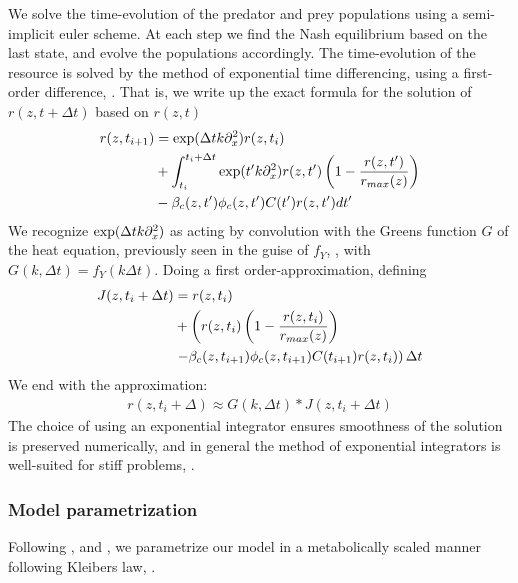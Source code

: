 We solve the time-evolution of the predator and prey populations using a semi-implicit euler scheme. At each step we find the Nash equilibrium based on the last state, and evolve the populations accordingly. The time-evolution of the resource is solved by the method of exponential time differencing, using a first-order difference, \citep{hochbruck2010exponential}. That is, we write up the exact formula for the solution of $r(z,t+\Delta t)$ based on $r(z,t)$
\begin{align}
  r(z,t_{i+1}) &= \exp(\Delta t k \part_x^2) r(z,t_{i}) \\
  & +\int_{t_i}^{t_{i}+\Delta t} \exp(t' k \part_x^2) r(z,t')\pa{1-\frac{r(z,t')}{r_{max}(z)}} \\
  & - \beta_c(z,t')\phi_c(z,t')C(t') r(z,t') dt'
\end{align}
We recognize $\exp(\Delta t k \partial_x^2)$ as acting by convolution with the Greens function $G$ of the heat equation, previously seen in the guise of $f_Y$, , with $G(k,\Delta t)=f_Y(k\Delta t)$.
Doing a first order-approximation, defining
\begin{align}
  J(z,t_{i}+\Delta t) &= r(z,t_i) \\
  &+ \left ( r(z,t_i)\pa{1-\frac{r(z,t_i)}{r_{max}(z)}} \right . \\
  & \left . - \beta_c(z,t_{i+1})\phi_c(z,t_{i+1})C(t_{i+1}) r(z,t_i) \right ) \Delta t
\end{align}
We end with the approximation:
\begin{align}
	r(z,t_i + \Delta) \approx G(k, \Delta t)*J(z,t_{i}+\Delta t)
\end{align}
The choice of using an exponential integrator ensures smoothness of the solution is preserved numerically, and in general the method of exponential integrators is well-suited for stiff problems, \citep{hochbruck2010exponential}.

\subsubsection*{Model parametrization}
Following \citep{yodzis1991}, and \citep{kha_2019}, we parametrize our model in a metabolically scaled manner following Kleibers law, \citep{kleiber}.



